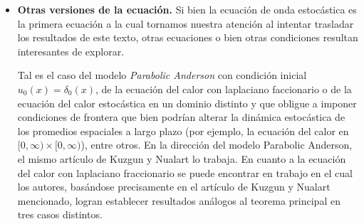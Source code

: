 \documentclass[letterpaper,twoside,12pt]{book}
\newcommand{\1}{\mathds{1}}
\theoremstyle{definition}
\theoremstyle{definition}
\theoremstyle{remark}
\theoremstyle{definition}
\theoremstyle{definition}
\theoremstyle{definition}
\theoremstyle{definition}
\theoremstyle{definition}
\begin{document}
\begin{itemize}
   \item \textbf{Otras versiones de la ecuación.} Si bien la ecuación de onda estocástica es la primera ecuación a la cual tornamos nuestra atención al intentar trasladar los resultados de este texto, otras ecuaciones o bien otras condiciones resultan interesantes de explorar.
    
   Tal es el caso del modelo \textit{Parabolic Anderson} con condición inicial $u_0(x)=\delta_0(x)$, de la ecuación del calor con laplaciano faccionario o de la ecuación del calor estocástica en un dominio distinto y que obligue a imponer condiciones de frontera que bien podrían alterar la dinámica estocástica de los promedios espaciales a largo plazo (por ejemplo, la ecuación del calor en $[0,\infty)\times [0,\infty)$), entre otros. En la dirección del modelo Parabolic Anderson, el mismo artículo de Kuzgun y Nualart \cite{KUZGUN202268} lo trabaja. En cuanto a la ecuación del calor con laplaciano fraccionario se puede encontrar en \cite{zhang2023convergence} trabajo en el cual los autores, basándose precisamente en el artículo de Kuzgun y Nualart mencionado, logran establecer resultados análogos al teorema principal en tres casos distintos. 


\end{itemize}
\end{document}
